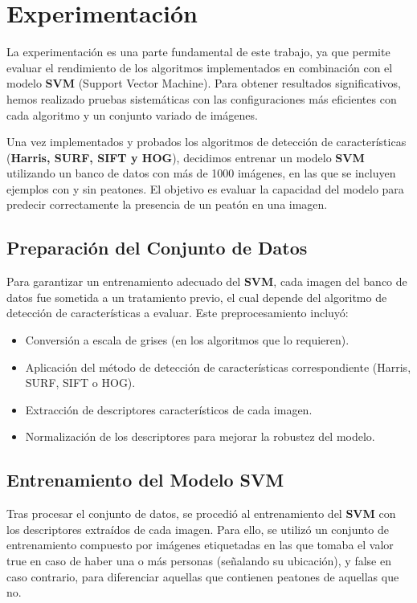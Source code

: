 \documentclass[a4paper]{article}
\begin{document}
\newpage

\section{Experimentación}

La experimentación es una parte fundamental de este trabajo, ya que permite evaluar el rendimiento de los algoritmos implementados en combinación con el modelo \textbf{SVM} (Support Vector Machine). 
Para obtener resultados significativos, hemos realizado pruebas sistemáticas con las configuraciones más eficientes con cada algoritmo y un conjunto variado de imágenes.
\par \hspace{1cm}

Una vez implementados y probados los algoritmos de detección de características (\textbf{Harris, SURF, SIFT y HOG}), decidimos entrenar un modelo \textbf{SVM} utilizando un banco de datos con más de 1000 imágenes, en las que se incluyen ejemplos con y sin peatones. El objetivo es evaluar la capacidad del modelo para predecir correctamente la presencia de un peatón en una imagen.

\subsection{Preparación del Conjunto de Datos}

Para garantizar un entrenamiento adecuado del \textbf{SVM}, cada imagen del banco de datos fue sometida a un tratamiento previo, el cual depende del algoritmo de detección de características a evaluar. Este preprocesamiento incluyó:
\begin{itemize}
    \item Conversión a escala de grises (en los algoritmos que lo requieren).
    \item Aplicación del método de detección de características correspondiente (Harris, SURF, SIFT o HOG).
    \item Extracción de descriptores característicos de cada imagen.
    \item Normalización de los descriptores para mejorar la robustez del modelo.
\end{itemize}

\subsection{Entrenamiento del Modelo SVM}

Tras procesar el conjunto de datos, se procedió al entrenamiento del \textbf{SVM} con los descriptores extraídos de cada imagen. Para ello, se utilizó un conjunto de entrenamiento compuesto por imágenes etiquetadas en las que tomaba 
el valor true en caso de haber una o más personas (señalando su ubicación), y false en caso contrario, para diferenciar aquellas que contienen peatones de aquellas que no.
\end{document}
